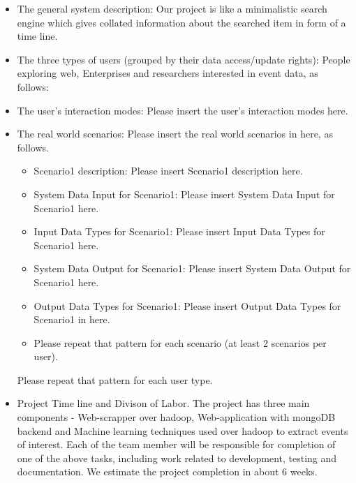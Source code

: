 \begin{itemize} 
\item{The general system description: } 
Our project is like a minimalistic search engine which gives collated information about the searched item in form of a time line.
\item{The three types of users (grouped by their data access/update rights): }
People exploring web, Enterprises and researchers interested in event data, as follows:
\item{The user's interaction modes: }
Please insert the user's interaction modes here.
\item{The real world scenarios: }
Please insert the real world scenarios in here, as follows.
	\begin{itemize} 
	\item{Scenario1 description: }
	Please insert Scenario1 description here.
	\item{System Data Input for Scenario1: }
	Please insert System Data Input for Scenario1 here.
	\item{Input Data Types for Scenario1: }
	Please insert Input Data Types for Scenario1 here.
	\item{System Data Output for Scenario1: }
	Please insert System Data Output for Scenario1 here.
	\item{Output Data Types for Scenario1: }
	Please insert Output Data Types for Scenario1 in here.
	\item {Please repeat that pattern for each scenario (at least 2 scenarios per user).}
	\end{itemize}
Please repeat that pattern for each user type.
\item{ Project Time line and Divison of Labor.}
The project has three main components - Web-scrapper over hadoop, Web-application with mongoDB backend and Machine learning techniques used over hadoop to extract events of interest. Each of the team member will be responsible for completion of one of the above tasks, including work related to development, testing and documentation. We estimate the project completion in about 6 weeks. 


\end{itemize}
